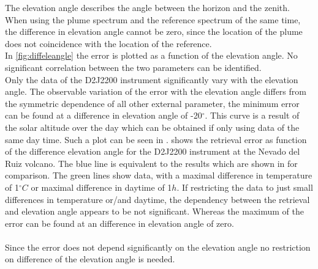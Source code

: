 The elevation angle describes the angle between the horizon and the zenith. When using the plume spectrum and the reference spectrum of the same time, the difference in elevation angle cannot be zero, since the location of the plume does not coincidence with the location of the reference.\\
In \cref{fig:diffeleangle} the  error is plotted as a function of the elevation angle. No significant correlation between the two parameters can be identified. \\
Only the data of the D2J2200 instrument significantly vary with the elevation angle. The observable variation of the  error with the elevation angle differs from the symmetric dependence of all other external parameter, the minimum  error can be found at a difference in elevation angle of -20$^{\circ}$. This curve is a result of the solar altitude over the day which can be obtained if only using data of the same day time. Such a plot can be seen in .
 shows the  retrieval error as function of the difference elevation angle for the D2J2200 instrument at the Nevado del Ruiz volcano. The blue line is equivalent to the results which are shown in  for comparison. The green lines show data, with a maximal difference in temperature of 1$^{\circ}C$ or maximal difference in daytime of 1$h$. If restricting the data to just small differences in temperature or/and daytime, the dependency between the  retrieval and elevation angle appears to be not significant. Whereas the maximum of the  error can be found at an difference in elevation angle of zero.\\
\\	
Since the  error does not depend significantly on the elevation angle no restriction on difference of the elevation angle is needed.
